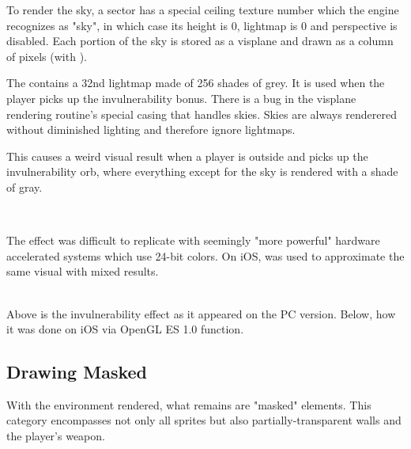 To render the sky, a sector has a special ceiling texture number which the engine recognizes as "sky", in which case its height is 0, lightmap is 0 and perspective is disabled. Each portion of the sky is stored as a visplane and drawn as a column of pixels (with ).\\

\par
The  contains a 32nd lightmap made of 256 shades of grey. It is used when the player picks up the invulnerability bonus. There is a bug in the visplane rendering routine's special casing that handles skies. Skies are always renderered without diminished lighting and therefore ignore lightmaps.\\
\par
 This causes a weird visual result when a player is outside and picks up the invulnerability orb, where everything except for the sky is rendered with a shade of gray.\\
\par 
{}\\
\par
The effect was difficult to replicate with seemingly "more powerful" hardware accelerated systems which use 24-bit colors. On iOS,  was used to approximate the same visual with mixed results.\\
\\
\par
Above is the invulnerability effect as it appeared on the PC version. Below, how it was done on iOS via OpenGL ES 1.0  function.\\
\par
{} 














\subsection{Drawing Masked}
With the environment rendered, what remains are "masked" elements. This category encompasses not only all sprites but also partially-transparent walls and the player's weapon.\\
 \par


